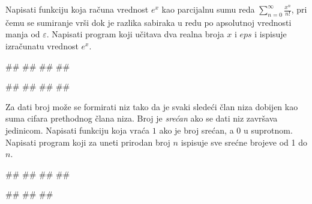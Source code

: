 \begin{Exercise}[label=v1.4_12] 
Napisati funkciju  koja
računa vrednost $e^x$ kao parcijalnu sumu reda
$\sum_{n=0}^{\infty}\frac{x^n}{n!}$, pri čemu se sumiranje vrši dok je
razlika sabiraka u redu po apsolutnoj vrednosti manja od
$\varepsilon$. Napisati program koji učitava dva realna broja $x$ i
$eps$ i ispisuje izračunatu vrednost $e^x$.

\begin{miditest}
\begin{upotreba}{1}
#\naslovInt#
##
##
##
\end{upotreba}
\end{miditest}
\begin{miditest}
\begin{upotreba}{2}
#\naslovInt#
##
##
##
\end{upotreba}
\end{miditest}
\end{Exercise}
\ifresenja 
\begin{Answer}[ref=v1.4_12]
\end{Answer} 
\fi

\begin{Exercise}[label=v1.4_13] 
Za dati broj može se formirati niz tako da je svaki sledeći član niza
dobijen kao suma cifara prethodnog člana niza. Broj je \emph{srećan}
ako se dati niz završava jedinicom. Napisati funkciju  koja vraća $1$ ako je broj srećan, a $0$ u
suprotnom. Napisati program koji za uneti prirodan broj $n$ ispisuje
sve srećne brojeve od 1 do $n$. 

\begin{miditest}
\begin{upotreba}{1}
#\naslovInt#
##
##
##
\end{upotreba}
\end{miditest}
\begin{miditest}
\begin{upotreba}{2}
#\naslovInt#
##
##
\end{upotreba}
\end{miditest}

\end{Exercise}
\ifresenja 
\begin{Answer}[ref=v1.4_13]
\end{Answer} 
\fi



